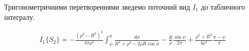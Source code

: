%
%
%

Тригонометричними перетвореннями зведемо поточний вид $ I_1 $ до табличного 
інтегралу.

\begin{equation*} \begin{aligned}
I_{1} \{ S_2 \} = - \frac{\left( \rho^2 - R^2 \right)^2}{4 \pi \rho^2} 
\int_{\psi}^{\pi} \frac{d \phi}{R^2 + \rho^2 - 2 \rho R \cos \phi} - 
\frac{R}{\rho} \frac{\sin \psi}{2 \pi} +  
\frac{\rho^2 + R^2}{4 \rho^2} \frac{\pi - \psi}{\pi}
\end{aligned} \end{equation*}

